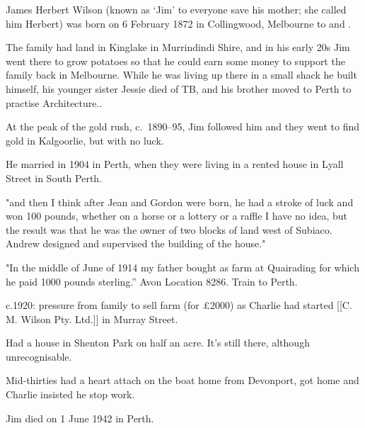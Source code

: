 
James Herbert Wilson (known as `Jim' to everyone save his mother; she called him Herbert) was born on 6 February 1872 in Collingwood, Melbourne\cite{VicPioneers} to  and .

The family had land in Kinglake in Murrindindi Shire,\cite{VicNames} and in his early 20s Jim went there to grow potatoes so that he could earn some money to support the family\cite{rae1} back in Melbourne.
While he was living up there in a small shack he built himself, his younger sister Jessie died of TB,
and his brother  moved to Perth to practise Architecture.\cite{rae1}.

At the peak of the gold rush, c.~1890--95, Jim followed him and they went to find gold in Kalgoorlie, but with no luck\cite{rae1}.

He married  in 1904 in Perth\cite{JimEdithMarriage},
when they were living in a rented house in Lyall Street in South Perth.\cite{rae1}

"and then I think after Jean and Gordon were born, he had a stroke of luck and won 100 pounds, whether on a horse or a lottery or a raffle I have no idea, but the result was that he was the owner of two blocks of land west of Subiaco. Andrew designed and supervised the building of the house."\cite{rae1}

"In the middle of June of 1914 my father bought as farm at Quairading for which he paid 1000 pounds sterling.''\cite{rae2}
Avon Location 8286. Train to Perth.

c.1920: pressure from family to sell farm (for £2000) as Charlie had started [[C. M. Wilson Pty. Ltd.]] in Murray Street.\cite{rae2}

Had a house in Shenton Park on half an acre. It's still there, although unrecognisable.

Mid-thirties had a heart attach on the boat home from Devonport, got home and Charlie insisted he stop work.\cite{rae2}

Jim died on 1 June 1942 in Perth.\cite{rae2}
